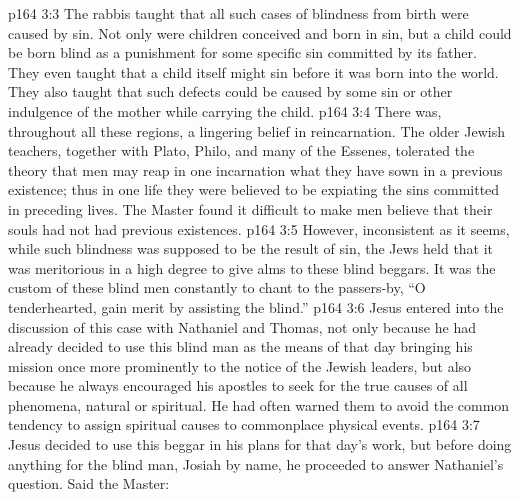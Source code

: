 \vs p164 3:3 \pc The rabbis taught that all such cases of blindness from birth were caused by sin. Not only were children conceived and born in sin, but a child could be born blind as a punishment for some specific sin committed by its father. They even taught that a child itself might sin before it was born into the world. They also taught that such defects could be caused by some sin or other indulgence of the mother while carrying the child.
\vs p164 3:4 There was, throughout all these regions, a lingering belief in reincarnation. The older Jewish teachers, together with Plato, Philo, and many of the Essenes, tolerated the theory that men may reap in one incarnation what they have sown in a previous existence; thus in one life they were believed to be expiating the sins committed in preceding lives. The Master found it difficult to make men believe that their souls had not had previous existences.
\vs p164 3:5 However, inconsistent as it seems, while such blindness was supposed to be the result of sin, the Jews held that it was meritorious in a high degree to give alms to these blind beggars. It was the custom of these blind men constantly to chant to the passers\hyp{}by, “O tenderhearted, gain merit by assisting the blind.”
\vs p164 3:6 \pc Jesus entered into the discussion of this case with Nathaniel and Thomas, not only because he had already decided to use this blind man as the means of that day bringing his mission once more prominently to the notice of the Jewish leaders, but also because he always encouraged his apostles to seek for the true causes of all phenomena, natural or spiritual. He had often warned them to avoid the common tendency to assign spiritual causes to commonplace physical events.
\vs p164 3:7 Jesus decided to use this beggar in his plans for that day’s work, but before doing anything for the blind man, Josiah by name, he proceeded to answer Nathaniel’s question. Said the Master: 
